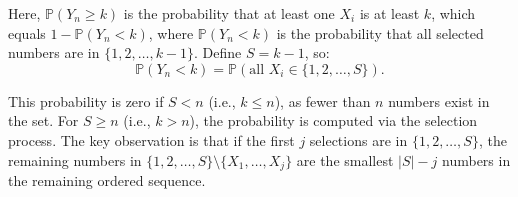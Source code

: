 \documentclass[12pt,a4paper]{article}
\theoremstyle{definition}
\begin{document}
    Here, $\mathbb{P}(Y_n \geq k)$ is the probability that at least one $X_i$ is at least $k$, which equals $1 - \mathbb{P}(Y_n < k)$, where $\mathbb{P}(Y_n < k)$ is the probability that all selected numbers are in $\{1, 2, \ldots, k-1\}$. Define $S = k-1$, so:
    \begin{equation}
        \mathbb{P}(Y_n < k) = \mathbb{P}(\text{all } X_i \in \{1, 2, \ldots, S\}).
    \end{equation}

    This probability is zero if $S < n$ (i.e., $k \leq n$), as fewer than $n$ numbers exist in the set. For $S \geq n$ (i.e., $k > n$), the probability is computed via the selection process. The key observation is that if the first $j$ selections are in $\{1, 2, \ldots, S\}$, the remaining numbers in $\{1, 2, \ldots, S\} \setminus \{X_1, \ldots, X_j\}$ are the smallest $|S| - j$ numbers in the remaining ordered sequence.
\end{document}
